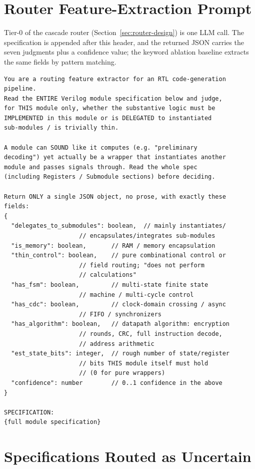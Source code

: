 \section{Router Feature-Extraction Prompt}
\label{app:router-prompt}

Tier-0 of the cascade router (Section~\ref{sec:router-design}) is one
LLM call. The specification is appended after this header, and the
returned JSON carries the seven judgments plus a confidence value; the
keyword ablation baseline extracts the same fields by pattern matching.

\begin{lstlisting}[language={},caption={Tier-0 routing feature-extraction
prompt.},label={lst:router-prompt}]
You are a routing feature extractor for an RTL code-generation
pipeline.
Read the ENTIRE Verilog module specification below and judge,
for THIS module only, whether the substantive logic must be
IMPLEMENTED in this module or is DELEGATED to instantiated
sub-modules / is trivially thin.

A module can SOUND like it computes (e.g. "preliminary
decoding") yet actually be a wrapper that instantiates another
module and passes signals through. Read the whole spec
(including Registers / Submodule sections) before deciding.

Return ONLY a single JSON object, no prose, with exactly these
fields:
{
  "delegates_to_submodules": boolean,  // mainly instantiates/
                     // encapsulates/integrates sub-modules
  "is_memory": boolean,       // RAM / memory encapsulation
  "thin_control": boolean,    // pure combinational control or
                     // field routing; "does not perform
                     // calculations"
  "has_fsm": boolean,         // multi-state finite state
                     // machine / multi-cycle control
  "has_cdc": boolean,         // clock-domain crossing / async
                     // FIFO / synchronizers
  "has_algorithm": boolean,   // datapath algorithm: encryption
                     // rounds, CRC, full instruction decode,
                     // address arithmetic
  "est_state_bits": integer,  // rough number of state/register
                     // bits THIS module itself must hold
                     // (0 for pure wrappers)
  "confidence": number        // 0..1 confidence in the above
}

SPECIFICATION:
{full module specification}
\end{lstlisting}

\section{Specifications Routed as Uncertain}
\label{app:uncertain}

